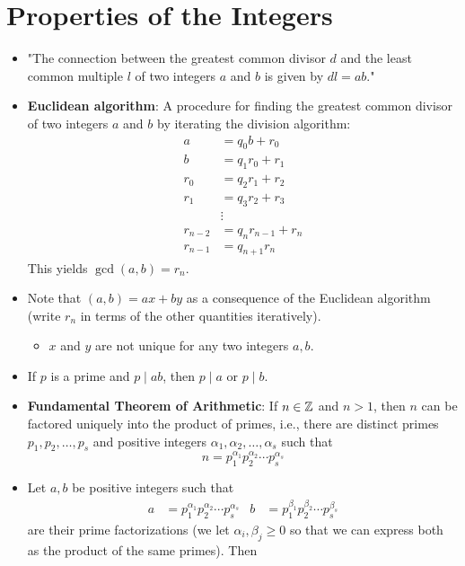 \documentclass[../notes.tex]{subfiles}
\begin{document}
\section{Properties of the Integers}
\begin{itemize}
    \item "The connection between the greatest common divisor $d$ and the least common multiple $l$ of two integers $a$ and $b$ is given by $dl=ab$."
    \item \textbf{Euclidean algorithm}: A procedure for finding the greatest common divisor of two integers $a$ and $b$ by iterating the division algorithm:
    \begin{align*}
        a &= q_0b+r_0\\
        b &= q_1r_0+r_1\\
        r_0 &= q_2r_1+r_2\\
        r_1 &= q_3r_2+r_3\\
        &\vdots\\
        r_{n-2} &= q_nr_{n-1}+r_n\\
        r_{n-1} &= q_{n+1}r_n
    \end{align*}
    This yields $\gcd(a,b)=r_n$.
    \item Note that $(a,b)=ax+by$ as a consequence of the Euclidean algorithm (write $r_n$ in terms of the other quantities iteratively).
    \begin{itemize}
        \item $x$ and $y$ are not unique for any two integers $a,b$.
    \end{itemize}
    \item If $p$ is a prime and $p\mid ab$, then $p\mid a$ or $p\mid b$.
    \item \textbf{Fundamental Theorem of Arithmetic}: If $n\in\mathbb{Z}$ and $n>1$, then $n$ can be factored uniquely into the product of primes, i.e., there are distinct primes $p_1,p_2,\dots,p_s$ and positive integers $\alpha_1,\alpha_2,\dots,\alpha_s$ such that
    \begin{equation*}
        n = p_1^{\alpha_1}p_2^{\alpha_2}\cdots p_s^{\alpha_s}
    \end{equation*}
    \item Let $a,b$ be positive integers such that
    \begin{align*}
        a &= p_1^{\alpha_1}p_2^{\alpha_2}\cdots p_s^{\alpha_s}&
        b &= p_1^{\beta_1}p_2^{\beta_2}\cdots p_s^{\beta_s}
    \end{align*}
    are their prime factorizations (we let $\alpha_i,\beta_j\geq 0$ so that we can express both as the product of the same primes). Then

\end{itemize}
\end{document}
